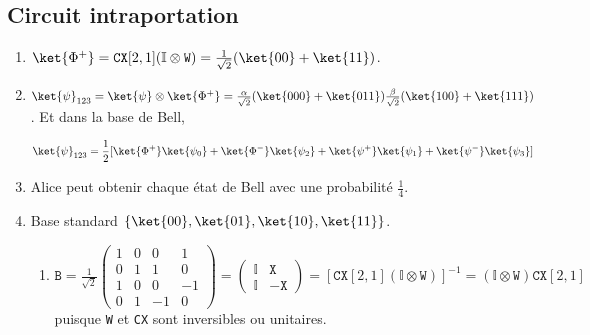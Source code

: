 \subsection{Circuit intraportation}
\begin{enumerate}
\item
$\ket{\Phi^{+}}=\texttt{CX}[2,1](\mathbb{I}\otimes\texttt{W})=\frac{1}{\sqrt{2} 
}(\ket{00}+\ket{11})$.

\item
$\ket{\psi}_{123}=\ket{\psi}\otimes\ket{\Phi^{+}}=\frac{\alpha}{\sqrt{2}}(\ket{
000}+\ket{011})\frac{\beta}{\sqrt{2}}(\ket{100}+\ket{111})$. Et dans la base de
Bell,

\begin{equation}
\ket{\psi}_{123}=\frac{1}{2}[\ket{\Phi^{+}}\ket{\psi_0}+\ket{\Phi^{-}}\ket{
\psi_2}+\ket{\psi^{+}}\ket{\psi_1}+\ket{\psi^{-}}\ket{\psi_3}]
\end{equation}

\item Alice peut obtenir chaque état de Bell avec une probabilité $\frac{1}{4}$.

\item Base standard $\{\ket{00},\ket{01},\ket{10},\ket{11}\}$.
\begin{enumerate}
\item $\texttt{B}=\frac{1}{\sqrt{2}}\begin{pmatrix}
1 & 0 & 0 & 1\\0 & 1 & 1 & 0\\1 & 0 & 0 & -1\\0 & 1 & -1 & 0
\end{pmatrix}=\begin{pmatrix}\mathbb{I} & \mathtt{X}\\\mathbb{I} & -\mathtt{X}
              \end{pmatrix}
=[\texttt{CX}[2,1](\mathbb{I}\otimes\texttt{W})]^{-1}=(\mathbb{I}\otimes
\texttt{W})\texttt{CX}[2,1]$ puisque \texttt{W} et \texttt{CX} sont inversibles 
ou unitaires.


\end{enumerate}
\end{enumerate}
